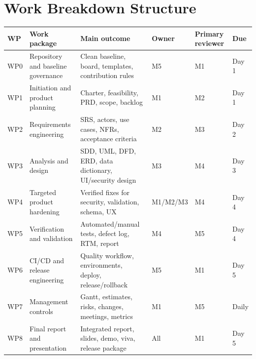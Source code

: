 \documentclass[
  10pt,
  a4paper,
  oneside]{report}
\newcounter{none} %
\begin{document}
\chapter{Work Breakdown Structure}\label{10-work-breakdown-structure}

{\def\LTcaptype{none} %
\begin{longtable}[]{@{}
  >{\raggedright\arraybackslash}p{}
  >{\raggedright\arraybackslash}p{}
  >{\raggedright\arraybackslash}p{}
  >{\raggedright\arraybackslash}p{}
  >{\raggedright\arraybackslash}p{}
  >{\raggedright\arraybackslash}p{}@{}}
\toprule\noalign{}
\begin{minipage}[b]{\linewidth}\raggedright
WP
\end{minipage} & \begin{minipage}[b]{\linewidth}\raggedright
Work package
\end{minipage} & \begin{minipage}[b]{\linewidth}\raggedright
Main outcome
\end{minipage} & \begin{minipage}[b]{\linewidth}\raggedright
Owner
\end{minipage} & \begin{minipage}[b]{\linewidth}\raggedright
Primary reviewer
\end{minipage} & \begin{minipage}[b]{\linewidth}\raggedright
Due
\end{minipage} \\
\midrule\noalign{}
\endhead
\bottomrule\noalign{}
\endlastfoot
WP0 & Repository and baseline governance & Clean baseline, board,
templates, contribution rules & M5 & M1 & Day 1 \\
WP1 & Initiation and product planning & Charter, feasibility, PRD,
scope, backlog & M1 & M2 & Day 1 \\
WP2 & Requirements engineering & SRS, actors, use cases, NFRs,
acceptance criteria & M2 & M3 & Day 2 \\
WP3 & Analysis and design & SDD, UML, DFD, ERD, data dictionary,
UI/security design & M3 & M4 & Day 3 \\
WP4 & Targeted product hardening & Verified fixes for security,
validation, schema, UX & M1/M2/M3 & M4 & Day 4 \\
WP5 & Verification and validation & Automated/manual tests, defect log,
RTM, report & M4 & M5 & Day 4 \\
WP6 & CI/CD and release engineering & Quality workflow, environments,
deploy, release/rollback & M5 & M1 & Day 5 \\
WP7 & Management controls & Gantt, estimates, risks, changes, meetings,
metrics & M1 & M5 & Daily \\
WP8 & Final report and presentation & Integrated report, slides, demo,
viva, release package & All & M1 & Day 5 \\
\end{longtable}
}
\end{document}
